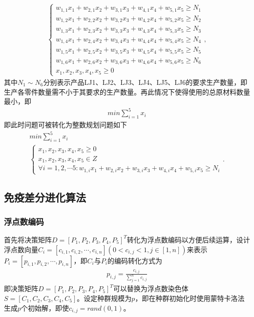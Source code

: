 \documentclass{whutmod}
\begin{document}
    	\begin{gather}
  \left\{\begin{matrix}w_{1,1} x_1+w_{2,1} x_2+w_{3,1} x_3+w_{4,1} x_4+w_{5,1} x_5\geqslant N_1
  \\ w_{1,2} x_1+w_{2,2} x_2+w_{3,2} x_3+w_{4,2} x_4+w_{5,2} x_5\geqslant N_2
  \\ w_{1,3} x_1+w_{2,3} x_2+w_{3,3} x_3+w_{4,3} x_4+w_{5,3} x_5\geqslant N_3
  \\ w_{1,4} x_1+w_{2,4} x_2+w_{3,4} x_3+w_{4,4} x_4+w_{5,4} x_5\geqslant N_4
  \\ w_{1,5} x_1+w_{2,5} x_2+w_{3,5} x_3+w_{4,5} x_4+w_{5,5} x_5\geqslant N_5
  \\ w_{1,6} x_1+w_{2,6} x_2+w_{3,6} x_3+w_{4,6} x_4+w_{5,6} x_5\geqslant N_6
  \\x_1,x_2,x_3,x_4,x_5\geqslant 0
  \end{matrix}\right.,
    \end{gather}
    其中$N_1\sim N_6$分别表示产品LJ1、LJ2、LJ3、LJ4、LJ5、LJ6的要求生产数量，即生产各零件数量需不小于其要求的生产数量。再此情况下使得使用的总原材料数量最小，即
    	\begin{gather}
   min\sum_{i=1}^5x_i
    \end{gather}
    即此时问题可被转化为整数规划问题如下
    \begin{gather}
    min\sum_{i=1}^5x_i\\
     \left\{\begin{matrix}
    x_1,x_2,x_3,x_4,x_5\geqslant 0
    \\x_1,x_2,x_3,x_4,x_5\in Z
    \\\forall i=1,2,\cdots5 :w_{1,i} x_1+w_{2,i} x_2+w_{3,i} x_3+w_{4,i} x_4+w_{5,i} x_5\geqslant N_i
    \end{matrix}\right..
    \end{gather}
    \subsection{免疫差分进化算法}
     \subsubsection{浮点数编码}
      首先将决策矩阵$D=[P_1,P_2,P_3,P_4,P_5]^T$转化为浮点数编码以方便后续运算，设计浮点数向量$C_i=[c_{i,1},c_{i,2},\cdots,c_{i,n}](0<c_{i,j}<1,j\in[1,n])$来表示$P_i=[p_{i,1},p_{i,2},\cdots,p_{i,n}]$，即$C_i$与$P_i$的编码转化方式为
      \begin{gather*}
      p_{i,j}=\frac{c_{i,j}}{\sum _{j=1}^n c_{i,j}}
      \end{gather*}
      即决策矩阵$D=[P_1,P_2,P_3,P_4,P_5]^T$可以替换为浮点数染色体$S=[C_1,C_2,C_3,C_4,C_5]$。设定种群规模为$p$，即在种群初始化时使用蒙特卡洛法生成$p$个初始解，即使$c_{i,j}=rand(0,1)$。
\end{document}
